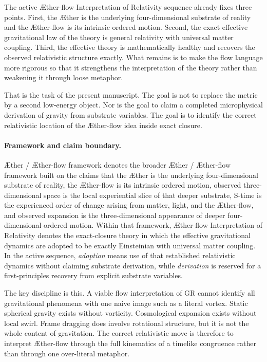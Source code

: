 \documentclass[11pt]{article}
\newcommand{\Aether}{\AE{}ther}
\newcommand{\Aflow}{\AE{}ther-flow}
\newcommand{\TheoryName}{\Aflow{} Interpretation of Relativity}
\newcommand{\TheoryProgram}{\Aether{} / \Aflow{} framework}
\begin{document}
The active \TheoryName{} sequence already fixes three points. First, the \Aether{} is the underlying four-dimensional substrate of reality and the \Aflow{} is its intrinsic ordered motion. Second, the exact effective gravitational law of the theory is general relativity with universal matter coupling. Third, the effective theory is mathematically healthy and recovers the observed relativistic structure exactly. What remains is to make the flow language more rigorous so that it strengthens the interpretation of the theory rather than weakening it through loose metaphor.

That is the task of the present manuscript. The goal is not to replace the metric by a second low-energy object. Nor is the goal to claim a completed microphysical derivation of gravity from substrate variables. The goal is to identify the correct relativistic location of the \Aflow{} idea inside exact closure.

\paragraph{Framework and claim boundary.}
\TheoryProgram{} denotes the broader \Aether{} / \Aflow{} framework built on the claims that the \Aether{} is the underlying four-dimensional substrate of reality, the \Aflow{} is its intrinsic ordered motion, observed three-dimensional space is the local experiential slice of that deeper substrate, S-time is the experienced order of change arising from matter, light, and the \Aflow{}, and observed expansion is the three-dimensional appearance of deeper four-dimensional ordered motion. Within that framework, \TheoryName{} denotes the exact-closure theory in which the effective gravitational dynamics are adopted to be exactly Einsteinian with universal matter coupling. In the active sequence, \emph{adoption} means use of that established relativistic dynamics without claiming substrate derivation, while \emph{derivation} is reserved for a first-principles recovery from explicit substrate variables.

The key discipline is this. A viable flow interpretation of GR cannot identify all gravitational phenomena with one naive image such as a literal vortex. Static spherical gravity exists without vorticity. Cosmological expansion exists without local swirl. Frame dragging does involve rotational structure, but it is not the whole content of gravitation. The correct relativistic move is therefore to interpret \Aflow{} through the full kinematics of a timelike congruence rather than through one over-literal metaphor.
\end{document}
